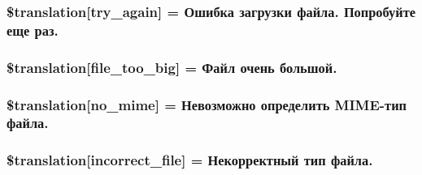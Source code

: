 \subsubsection[{\$translation}]{\setlength{\rightskip}{0pt plus 5cm}\$translation\mbox{[}\textquotesingle{}try\+\_\+again\textquotesingle{}\mbox{]} = \textquotesingle{}Ошибка загрузки файла. Попробуйте еще раз.\textquotesingle{}}\label{class_8upload_8ru___r_u_8php_a3afc377bd803683314f413a814243066}
\hypertarget{class_8upload_8ru___r_u_8php_a476278eb4a0c3df56af068e2d511a741}{}
\subsubsection[{\$translation}]{\setlength{\rightskip}{0pt plus 5cm}\$translation\mbox{[}\textquotesingle{}file\+\_\+too\+\_\+big\textquotesingle{}\mbox{]} = \textquotesingle{}Файл очень большой.\textquotesingle{}}\label{class_8upload_8ru___r_u_8php_a476278eb4a0c3df56af068e2d511a741}
\hypertarget{class_8upload_8ru___r_u_8php_a191a55df8e3bb7f3c51b70f3c1932e02}{}
\subsubsection[{\$translation}]{\setlength{\rightskip}{0pt plus 5cm}\$translation\mbox{[}\textquotesingle{}no\+\_\+mime\textquotesingle{}\mbox{]} = \textquotesingle{}Невозможно определить M\+I\+M\+E-\/тип файла.\textquotesingle{}}\label{class_8upload_8ru___r_u_8php_a191a55df8e3bb7f3c51b70f3c1932e02}
\hypertarget{class_8upload_8ru___r_u_8php_a4d32343e2699edd6fd435f9c832cb9c7}{}
\subsubsection[{\$translation}]{\setlength{\rightskip}{0pt plus 5cm}\$translation\mbox{[}\textquotesingle{}incorrect\+\_\+file\textquotesingle{}\mbox{]} = \textquotesingle{}Некорректный тип файла.\textquotesingle{}}\label{class_8upload_8ru___r_u_8php_a4d32343e2699edd6fd435f9c832cb9c7}
\hypertarget{class_8upload_8ru___r_u_8php_a0dd3e4930ca1f59ae280f4b1006525cd}{}
